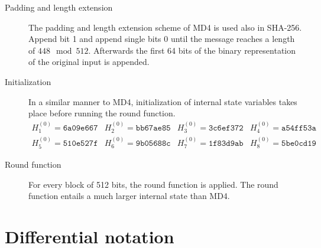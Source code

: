\begin{description}
  \item[Padding and length extension]
    The padding and length extension scheme of MD4 is used also in SHA-256.
    Append bit 1 and append single bits 0 until the message reaches a length
    of $448 \mod{512}$. Afterwards the first 64 bits of the binary representation
    of the original input is appended.
  \item[Initialization]
    In a similar manner to MD4,
    initialization of internal state variables takes place before running the
    round function.
    \[
      \begin{array}{llll}
        H_1^{(0)} = \texttt{6a09e667} &
        H_2^{(0)} = \texttt{bb67ae85} &
        H_3^{(0)} = \texttt{3c6ef372} &
        H_4^{(0)} = \texttt{a54ff53a} \\
        H_5^{(0)} = \texttt{510e527f} &
        H_6^{(0)} = \texttt{9b05688c} &
        H_7^{(0)} = \texttt{1f83d9ab} &
        H_8^{(0)} = \texttt{5be0cd19}
      \end{array}
    \]
  \item[Round function]
    For every block of 512 bits, the round function is applied.
    The round function entails a much larger internal state than MD4.


\end{description}

\section{Differential notation}
\label{sec:dc-notation}
%
\cite{char-2006}

